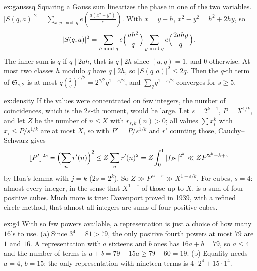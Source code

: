 \begin{solution}{ex:gausssq}
\idea Squaring a Gauss sum linearizes the phase in one of the two variables.
\writeup $|S(q,a)|^2=\sum_{x,y\bmod q}e(\frac{a(x^2-y^2)}q)$. With $x=y+h$, $x^2-y^2=h^2+2hy$, so
\[
|S(q,a)|^2=\sum_{h\bmod q}e\Bigl(\frac{ah^2}q\Bigr)\sum_{y\bmod q}e\Bigl(\frac{2ahy}q\Bigr).
\]
The inner sum is $q$ if $q\mid2ah$, that is $q\mid2h$ since $(a,q)=1$, and $0$ otherwise. At most two classes $h$ modulo $q$ have $q\mid2h$, so $|S(q,a)|^2\le2q$. Then the $q$-th term of $\mathfrak S_{s,2}$ is at most $q(\frac{2}{q})^{s/2}=2^{s/2}q^{1-s/2}$, and $\sum_qq^{1-s/2}$ converges for $s\ge5$.
\end{solution}
\begin{solution}{ex:density}
\idea If the values were concentrated on few integers, the number of coincidences, which is the $2s$-th moment, would be large.
\writeup Let $s=2^{k-1}$, $P=X^{1/k}$, and let $Z$ be the number of $n\le X$ with $r_{s,k}(n)>0$; all values $\sum x_i^k$ with $x_i\le P/s^{1/k}$ are at most $X$, so with $P'=P/s^{1/k}$ and $r'$ counting those, Cauchy--Schwarz gives
\[
\lfloor P'\rfloor^{2s}=\Bigl(\sum_nr'(n)\Bigr)^2\le Z\sum_nr'(n)^2=Z\int_0^1|f_{P'}|^{2^k}\ll ZP'^{2^k-k+\varepsilon}
\]
by Hua's lemma with $j=k$ ($2s=2^k$). So $Z\gg P'^{k-\varepsilon}\gg X^{1-\varepsilon/k}$. For cubes, $s=4$: almost every integer, in the sense that $X^{1-\varepsilon}$ of those up to $X$, is a sum of four positive cubes. Much more is true: Davenport proved in 1939, with a refined circle method, that almost all integers are sums of four positive cubes.
\end{solution}
\begin{solution}{ex:g4}
\idea With so few powers available, a representation is just a choice of how many $16$'s to use.
\writeup (a) Since $3^4=81>79$, the only positive fourth powers at most $79$ are $1$ and $16$. A representation with $a$ sixteens and $b$ ones has $16a+b=79$, so $a\le4$ and the number of terms is $a+b=79-15a\ge79-60=19$. (b) Equality needs $a=4$, $b=15$: the only representation with nineteen terms is $4\cdot2^4+15\cdot1^4$.
\end{solution}
